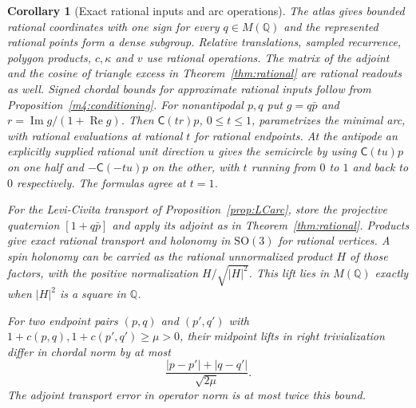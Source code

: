 \documentclass[11pt,reqno]{amsart}
\newtheorem{corollary}[theorem]{Corollary}
\theoremstyle{definition}
\theoremstyle{remark}
\numberwithin{equation}{section}
\newcommand{\Q}{\mathbb{Q}}
\newcommand{\re}{\operatorname{Re}}
\newcommand{\im}{\operatorname{Im}}
\newcommand{\SO}{\mathrm{SO}}
\newcommand{\Cay}{\mathsf{C}}
\begin{document}
\begin{corollary}[Exact rational inputs and arc operations]\label{m4:arithmetic}
The atlas gives bounded rational coordinates with one sign for every $q\in M(\Q)$ and the represented rational points form a dense subgroup. Relative translations, sampled recurrence, polygon products, $c,\kappa$ and $v$ use rational operations. The matrix of the adjoint and the cosine of triangle excess in Theorem~\ref{thm:rational} are rational readouts as well. Signed chordal bounds for approximate rational inputs follow from Proposition~\ref{m4:conditioning}. For nonantipodal $p,q$ put $g=q\bar p$ and $r=\im g/(1+\re g)$. Then $\Cay(tr)p$, $0\le t\le1$, parametrizes the minimal arc, with rational evaluations at rational $t$ for rational endpoints. At the antipode an explicitly supplied rational unit direction $u$ gives the semicircle by using $\Cay(tu)p$ on one half and $-\Cay(-tu)p$ on the other, with $t$ running from $0$ to $1$ and back to $0$ respectively. The formulas agree at $t=1$.

For the Levi-Civita transport of Proposition~\ref{prop:LCarc}, store the projective quaternion $[1+q\bar p]$ and apply its adjoint as in Theorem~\ref{thm:rational}. Products give exact rational transport and holonomy in $\SO(3)$ for rational vertices. A spin holonomy can be carried as the rational unnormalized product $H$ of those factors, with the positive normalization $H/\sqrt{|H|^2}$. This lift lies in $M(\Q)$ exactly when $|H|^2$ is a square in $\Q$.

For two endpoint pairs $(p,q)$ and $(p',q')$ with $1+c(p,q),1+c(p',q')\ge\mu>0$, their midpoint lifts in right trivialization differ in chordal norm by at most
\[
 \frac{|p-p'|+|q-q'|}{\sqrt{2\mu}}.
\]
The adjoint transport error in operator norm is at most twice this bound.
\end{corollary}
\end{document}
